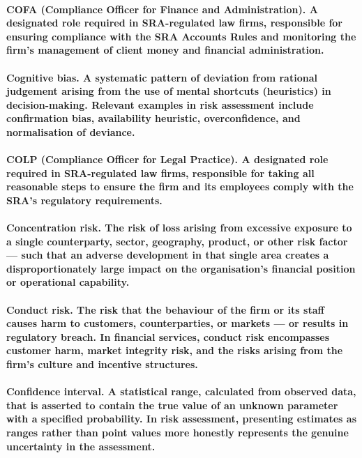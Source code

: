 \paragraph{\textbf{COFA (Compliance Officer for Finance and Administration)}. A designated role required in SRA-regulated law firms, responsible for ensuring compliance with the SRA Accounts Rules and monitoring the firm's management of client money and financial administration.}

\paragraph{\textbf{Cognitive bias}. A systematic pattern of deviation from rational judgement arising from the use of mental shortcuts (heuristics) in decision-making. Relevant examples in risk assessment include confirmation bias, availability heuristic, overconfidence, and normalisation of deviance.}

\paragraph{\textbf{COLP (Compliance Officer for Legal Practice)}. A designated role required in SRA-regulated law firms, responsible for taking all reasonable steps to ensure the firm and its employees comply with the SRA's regulatory requirements.}

\paragraph{\textbf{Concentration risk}. The risk of loss arising from excessive exposure to a single counterparty, sector, geography, product, or other risk factor — such that an adverse development in that single area creates a disproportionately large impact on the organisation's financial position or operational capability.}

\paragraph{\textbf{Conduct risk}. The risk that the behaviour of the firm or its staff causes harm to customers, counterparties, or markets — or results in regulatory breach. In financial services, conduct risk encompasses customer harm, market integrity risk, and the risks arising from the firm's culture and incentive structures.}

\paragraph{\textbf{Confidence interval}. A statistical range, calculated from observed data, that is asserted to contain the true value of an unknown parameter with a specified probability. In risk assessment, presenting estimates as ranges rather than point values more honestly represents the genuine uncertainty in the assessment.}

